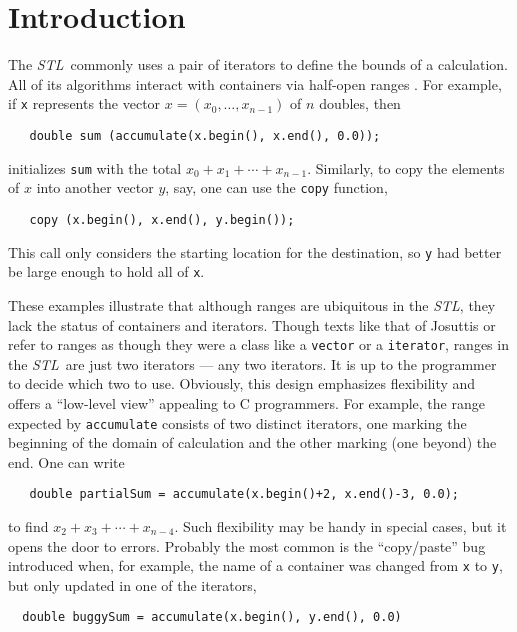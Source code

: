 \documentclass[12pt]{article}
\newcommand{\stl}{{\it STL}}
\begin{document}
\clearpage

%
% 

\section{Introduction}

  The \stl\ commonly uses a pair of iterators to define the bounds of a
calculation.  All of its algorithms interact with containers via
half-open ranges \citep{josuttis99}.  For example, if {\tt x}
represents the vector $x = (x_0,\ldots,x_{n-1})$ of $n$ doubles, then
\begin{verbatim} 
   double sum (accumulate(x.begin(), x.end(), 0.0));
\end{verbatim}
initializes {\tt sum} with the total $x_0 + x_1 + \cdots + x_{n-1}$.
Similarly, to copy the elements of $x$ into another vector $y$, say,
one can use the {\tt copy} function,
\begin{verbatim}
   copy (x.begin(), x.end(), y.begin());
\end{verbatim}
This call only considers the starting location for the destination, so
{\tt y} had better be large enough to hold all of {\tt x}.


  These examples illustrate that although ranges are ubiquitous in the
\stl, they lack the status of containers and iterators.  Though texts
like that of Josuttis or \citet{austern99} refer to ranges as though
they were a class like a {\tt vector} or a {\tt iterator}, ranges in
the \stl\ are just two iterators --- any two iterators.  It is up to
the programmer to decide which two to use.  Obviously, this design
emphasizes flexibility and offers a ``low-level view'' appealing to C
programmers.  For example, the range expected by {\tt accumulate}
consists of two distinct iterators, one marking the beginning of the
domain of calculation and the other marking (one beyond) the end.  One
can write
\begin{verbatim} 
   double partialSum = accumulate(x.begin()+2, x.end()-3, 0.0);
\end{verbatim}
to find $x_2 + x_3 + \cdots + x_{n-4}$. Such flexibility may be handy
in special cases, but it opens the door to errors.  Probably the most
common is the ``copy/paste'' bug introduced when, for example, the
name of a container was changed from {\tt x} to {\tt y}, but only
updated in one of the iterators,
\begin{verbatim} 
  double buggySum = accumulate(x.begin(), y.end(), 0.0)
\end{verbatim}
\end{document}
